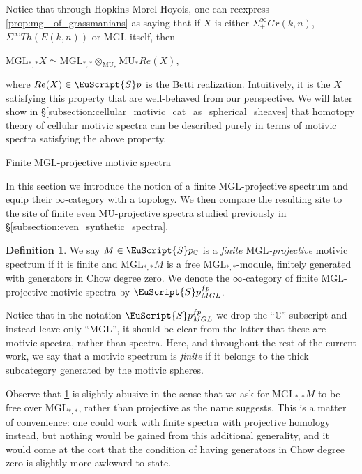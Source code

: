 \documentclass[oneside,a4paper]{amsart}
\makeatletter
\newcommand{\euscr}[1]{\EuScript{#1}} %
\newcommand{\MU}{\mathrm{MU}} %
\newcommand{\MGL}{\mathrm{MGL}} %
\newcommand{\spectra}{\euscr{S}p} %
\newcommand{\cspectra}{\euscr{S}p_{\mathbb{C}}} %
\newcommand{\spectramglfp}{\spectra_{MGL}^{fp}} %
\theoremstyle{plain}
\theoremstyle{definition}
\newtheorem{defin}[thm]{Definition}
\theoremstyle{remark}
\def\subsection{\@startsection{subsection}{1}%
  \z@{.7\linespacing\@plus\linespacing}{.5\linespacing}%
  {\normalfont\bfseries\centering}}%
\makeatother
\begin{document}
Notice that through Hopkins-Morel-Hoyois, one can reexpress \cref{prop:mgl_of_grassmanians} as saying that if $X$ is either $\Sigma^{\infty}_{+} Gr(k, n)$, $\Sigma^{\infty} Th(E(k, n))$ or $\MGL$ itself, then 

\begin{center}
$\MGL_{*, *} X \simeq \MGL_{*, *} \otimes _{\MU_{*}} \MU_{*} Re(X)$, 
\end{center}
where $Re(X) \in \spectra$ is the Betti realization. Intuitively, it is the $X$ satisfying this property that are well-behaved from our perspective. We will later show in \S\ref{subsection:cellular_motivic_cat_as_spherical_sheaves} that homotopy theory of cellular motivic spectra can be described purely in terms of motivic spectra satisfying the above property. 

\subsection{Finite $\MGL$-projective motivic spectra}

In this section we introduce the notion of a finite $\MGL$-projective spectrum and equip their $\infty$-category with a topology. We then compare the resulting site to the site of finite even $\MU$-projective spectra studied previously in \S\ref{subsection:even_synthetic_spectra}.

\begin{defin}
\label{definition:finite_mgl_projective_spectrum}
We say $M \in \cspectra$ is a \emph{finite $\MGL$-projective} motivic spectrum if it is finite and $\MGL_{*, *} M$ is a free $\MGL_{*, *}$-module, finitely generated with generators in Chow degree zero. We denote the $\infty$-category of finite $\MGL$-projective motivic spectra by $\spectramglfp$. 
\end{defin}
Notice that in the notation $\spectramglfp$ we drop the ``$\mathbb{C}$''-subscript and instead leave only ``$\MGL$'', it should be clear from the latter that these are motivic spectra, rather than spectra. Here, and throughout the rest of the current work, we say that a motivic spectrum is \emph{finite} if it belongs to the thick subcategory generated by the motivic spheres. 

Observe that \cref{definition:finite_mgl_projective_spectrum} is slightly abusive in the sense that we ask for $\MGL_{*, *} M$ to be free over $\MGL_{*, *}$, rather than projective as the name suggests. This is a matter of convenience: one could work with finite spectra with projective homology instead, but nothing would be gained from this additional generality, and it would come at the cost that the condition of having generators in Chow degree zero is slightly more awkward to state. 
\end{document}
